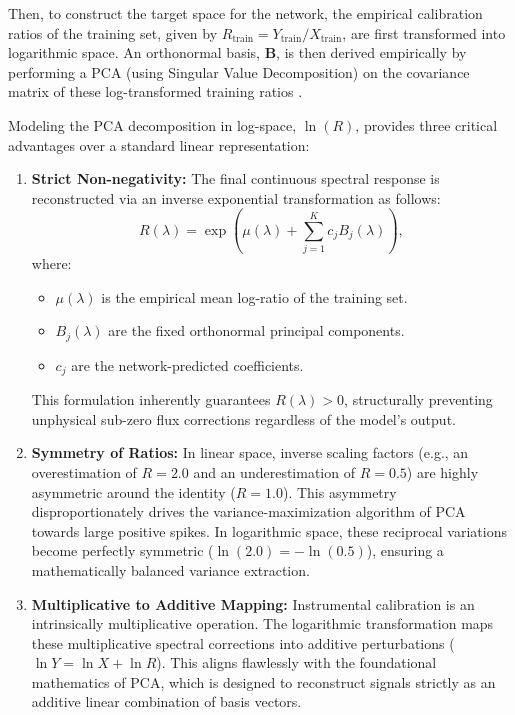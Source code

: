 \documentclass{aa}
\begin{document}
Then, to construct the target space for the network, the empirical calibration ratios of the training set, given by $R_{\text{train}} = Y_{\text{train}} / X_{\text{train}}$, are first transformed into logarithmic space. An orthonormal basis, $\mathbf{B}$, is then derived empirically by performing a PCA (using Singular Value Decomposition) on the covariance matrix of these log-transformed training ratios \citep{connolly1995}. 

Modeling the PCA decomposition in log-space, $\ln(R)$, provides three critical advantages over a standard linear representation:
\begin{enumerate}[itemsep=0.25cm]
    \item \textbf{Strict Non-negativity:} The final continuous spectral response is reconstructed via an inverse exponential transformation as follows:
    \begin{equation}
        R(\lambda) = \exp\left( \mu(\lambda) + \sum_{j=1}^{K} c_j B_j(\lambda) \right),
    \end{equation}
    where:
    \vspace{0.10cm}
    \begin{itemize}[itemsep=0.10cm]
        \item $\mu(\lambda)$ is the empirical mean log-ratio of the training set.
        \item $B_j(\lambda)$ are the fixed orthonormal principal components.
        \item $c_j$ are the network-predicted coefficients. 
    \end{itemize}
    \vspace{0.10cm} This formulation inherently guarantees $R(\lambda) > 0$, structurally preventing unphysical sub-zero flux corrections regardless of the model's output.
    
    \item \textbf{Symmetry of Ratios:} In linear space, inverse scaling factors (e.g., an overestimation of $R=2.0$ and an underestimation of $R=0.5$) are highly asymmetric around the identity ($R=1.0$). This asymmetry disproportionately drives the variance-maximization algorithm of PCA towards large positive spikes. In logarithmic space, these reciprocal variations become perfectly symmetric ($\ln(2.0) = -\ln(0.5)$), ensuring a mathematically balanced variance extraction.

    \item \textbf{Multiplicative to Additive Mapping:} Instrumental calibration is an intrinsically multiplicative operation. The logarithmic transformation maps these multiplicative spectral corrections into additive perturbations ($\ln Y = \ln X + \ln R$). This aligns flawlessly with the foundational mathematics of PCA, which is designed to reconstruct signals strictly as an additive linear combination of basis vectors.
\end{enumerate}
\end{document}
